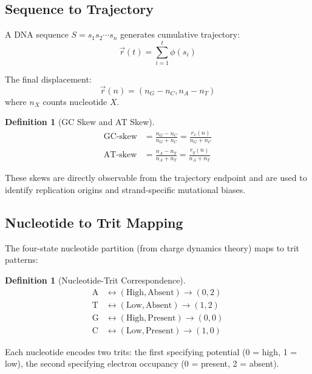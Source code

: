 \documentclass[twocolumn,10pt]{article}
\newtheorem{definition}[theorem]{Definition}
\theoremstyle{remark}
\begin{document}
\subsection{Sequence to Trajectory}

A DNA sequence $S = s_1 s_2 \cdots s_n$ generates cumulative trajectory:
\begin{equation}
\vec{r}(t) = \sum_{i=1}^t \phi(s_i)
\end{equation}

The final displacement:
\begin{equation}
\vec{r}(n) = (n_G - n_C, n_A - n_T)
\end{equation}
where $n_X$ counts nucleotide $X$.

\begin{definition}[GC Skew and AT Skew]
\begin{align}
\text{GC-skew} &= \frac{n_G - n_C}{n_G + n_C} = \frac{r_x(n)}{n_G + n_C} \\
\text{AT-skew} &= \frac{n_A - n_T}{n_A + n_T} = \frac{r_y(n)}{n_A + n_T}
\end{align}
\end{definition}

These skews are directly observable from the trajectory endpoint and are used to identify replication origins and strand-specific mutational biases.

\subsection{Nucleotide to Trit Mapping}

The four-state nucleotide partition (from charge dynamics theory) maps to trit patterns:

\begin{definition}[Nucleotide-Trit Correspondence]
\label{def:nucleotide_trit}
\begin{align}
\text{A} &\leftrightarrow (\text{High}, \text{Absent}) \to (0, 2) \\
\text{T} &\leftrightarrow (\text{Low}, \text{Absent}) \to (1, 2) \\
\text{G} &\leftrightarrow (\text{High}, \text{Present}) \to (0, 0) \\
\text{C} &\leftrightarrow (\text{Low}, \text{Present}) \to (1, 0)
\end{align}
\end{definition}

Each nucleotide encodes two trits: the first specifying potential (0 = high, 1 = low), the second specifying electron occupancy (0 = present, 2 = absent).
\end{document}
